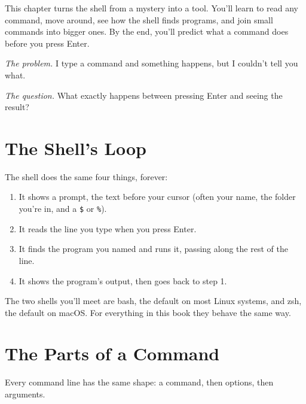 
\begin{chapterintro}

This chapter turns the shell from a mystery into a tool. You'll learn to read any command, move around, see how the shell finds programs, and join small commands into bigger ones. By the end, you'll predict what a command does before you press Enter.

\end{chapterintro}

\emph{The problem.} I type a command and something happens, but I couldn't tell you what.

\emph{The question.} What exactly happens between pressing Enter and seeing the result?

\section{The Shell's Loop}\label{02-the-shell-talking-to-your-computer-in-words:the-shells-loop}

The shell does the same four things, forever:

\begin{enumerate}
\def\labelenumi{\arabic{enumi}.}
\tightlist
\item
  It shows a prompt, the text before your cursor (often your name, the folder you're in, and a \texttt{\$} or \texttt{\%}).
\item
  It reads the line you type when you press Enter.
\item
  It finds the program you named and runs it, passing along the rest of the line.
\item
  It shows the program's output, then goes back to step 1.
\end{enumerate}

The two shells you'll meet are bash, the default on most Linux systems, and zsh, the default on macOS. For everything in this book they behave the same way.

\section{The Parts of a Command}\label{02-the-shell-talking-to-your-computer-in-words:the-parts-of-a-command}

Every command line has the same shape: a command, then options, then arguments.

